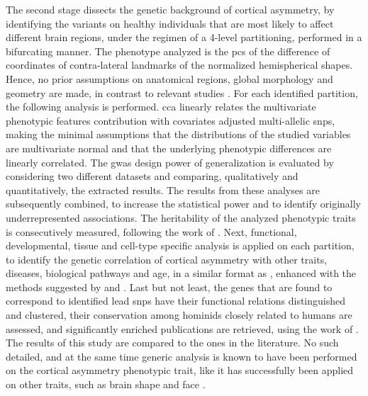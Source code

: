 The second stage dissects the genetic background of cortical asymmetry, by identifying the variants on healthy individuals that are most likely to affect different brain regions, under the regimen of a 4-level partitioning, performed in a bifurcating manner. The phenotype analyzed is the \acp{pc} of the difference of coordinates of contra-lateral landmarks of the normalized hemispherical shapes. Hence, no prior assumptions on anatomical regions, global morphology and geometry are made, in contrast to relevant studies \cite{Kong2022,Zhao2022}. For each identified partition, the following analysis is performed. \Ac{cca} linearly relates the multivariate phenotypic features contribution with covariates adjusted multi-allelic \acp{snp}, making the minimal assumptions that the distributions of the studied variables are multivariate normal and that the underlying phenotypic differences are linearly correlated. The \ac{gwas} design power of generalization is evaluated by considering two different datasets and comparing, qualitatively and quantitatively, the extracted results. The results from these analyses are subsequently combined, to increase the statistical power and to identify originally underrepresented associations. The heritability of the analyzed phenotypic traits is consecutively measured, following the work of \citet{Bulik-Sullivan2015}. Next, functional, developmental, tissue and cell-type specific analysis is applied on each partition, to identify the genetic correlation of cortical asymmetry with other traits, diseases, biological pathways and age, in a similar format as \citet{Sha2021}, enhanced with the methods suggested by \citet{McLean2010} and \citet{Finucane2018}. Last but not least, the genes that are found to correspond to identified lead \acp{snp} have their functional relations distinguished and clustered, their conservation among hominids closely related to humans are assessed, and significantly enriched publications are retrieved, using the work of \citet{Szklarczyk2021}. The results of this study are compared to the ones in the literature. No such detailed, and at the same time generic analysis is known to have been performed on the cortical asymmetry phenotypic trait, like it has successfully been applied on other traits, such as brain shape \cite{Naqvi2021} and face \cite{Claes2018}.